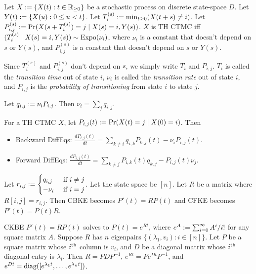 \documentclass[a4paper, 12pt, fleqn]{article}
\DeclareMathOperator{\Expo}{\opname{Expo}}
\begin{document}
\begin{theorem}
Let $X := \{X(t): t \in \mathbb{R}_{\ge 0}\}$ be a stochastic process
on discrete state-space $D$. Let $Y(t) := \{X(u): 0 \le u < t \}$.
Let $T_i^{(s)} := \min_{t \ge 0} (X(t+s) \neq i)$.
Let $P^{(s)}_{i,j} := \Pr(X(s+T_i^{(s)})=j \mid X(s)=i, Y(s))$.
$X$ is TH CTMC iff $(T_i^{(s)} \mid X(s)=i, Y(s)) \sim \Expo(\nu_i)$,
where $\nu_i$ is a constant that doesn't depend on $s$ or $Y(s)$,
and $P^{(s)}_{i,j}$ is a constant that doesn't depend on $s$ or $Y(s)$.

Since $T_i^{(s)}$ and $P^{(s)}_{i,j}$ don't depend on $s$, we simply write $T_i$ and $P_{i,j}$.
$T_i$ is called the \emph{transition time} out of state $i$,
$\nu_i$ is called the \emph{transition rate} out of state $i$,
and $P_{i,j}$ is the \emph{probability of transitioning} from state $i$ to state $j$.
\end{theorem}

Let $q_{i,j} := \nu_iP_{i,j}$. Then $\nu_i = \sum_j q_{i,j}$.

\begin{theorem}
For a TH CTMC $X$, let $P_{i,j}(t) := \Pr(X(t)=j \mid X(0)=i)$. Then
\begin{itemize}
\item Backward DiffEqs: $\displaystyle \frac{dP_{i,j}(t)}{dt} = \sum_{k \neq i} q_{i,k}P_{k,j}(t) - \nu_iP_{i,j}(t)$.
\item Forward DiffEqs: $\displaystyle \frac{dP_{i,j}(t)}{dt} = \sum_{k \neq j} P_{i,k}(t)q_{k,j} - P_{i,j}(t)\nu_j$.  \end{itemize}
Let $r_{i,j} := \begin{cases}q_{i,j} & \textrm{ if } i \neq j \\ -\nu_i & \textrm{ if } i = j\end{cases}$.
Let the state space be $[n]$. Let $R$ be a matrix where $R[i,j] = r_{i,j}$.
Then CBKE becomes $P'(t) = RP(t)$ and CFKE becomes $P'(t) = P(t)R$.
\end{theorem}

\begin{lemma}
CKBE $P'(t) = RP(t)$ solves to $P(t) = e^{Rt}$,
where $e^{A} := \sum_{i=0}^{\infty} A^i/i!$ for any square matrix $A$.
Suppose $R$ has $n$ eigenpairs $\{(\lambda_1, v_i): i \in [n]\}$.
Let $P$ be a square matrix whose $i^{\textrm{th}}$ column is $v_i$,
and $D$ be a diagonal matrix whose $i^{\textrm{th}}$ diagonal entry is $\lambda_i$.
Then $R = PDP^{-1}$, $e^{Rt} = Pe^{Dt}P^{-1}$,
and $e^{Dt} = \operatorname{diag}([e^{\lambda_1t}, \ldots, e^{\lambda_nt}])$.
\end{lemma}
\end{document}
